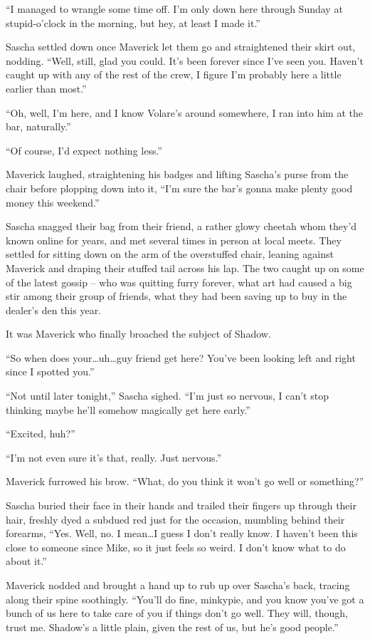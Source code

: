 ``I managed to wrangle some time off. I'm only down here through Sunday at stupid-o'clock in the morning, but hey, at least I made it.''

Sascha settled down once Maverick let them go and straightened their skirt out, nodding. ``Well, still, glad you could. It's been forever since I've seen you. Haven't caught up with any of the rest of the crew, I figure I'm probably here a little earlier than most.''

``Oh, well, I'm here, and I know Volare's around somewhere, I ran into him at the bar, naturally.''

``Of course, I'd expect nothing less.''

Maverick laughed, straightening his badges and lifting Sascha's purse from the chair before plopping down into it, ``I'm sure the bar's gonna make plenty good money this weekend.''

Sascha snagged their bag from their friend, a rather glowy cheetah whom they'd known online for years, and met several times in person at local meets. They settled for sitting down on the arm of the overstuffed chair, leaning against Maverick and draping their stuffed tail across his lap. The two caught up on some of the latest gossip -- who was quitting furry forever, what art had caused a big stir among their group of friends, what they had been saving up to buy in the dealer's den this year.

It was Maverick who finally broached the subject of Shadow.

``So when does your\ldots{}uh\ldots{}guy friend get here? You've been looking left and right since I spotted you.''

``Not until later tonight,'' Sascha sighed. ``I'm just so nervous, I can't stop thinking maybe he'll somehow magically get here early.''

``Excited, huh?''

``I'm not even sure it's that, really. Just nervous.''

Maverick furrowed his brow. ``What, do you think it won't go well or something?''

Sascha buried their face in their hands and trailed their fingers up through their hair, freshly dyed a subdued red just for the occasion, mumbling behind their forearms, ``Yes. Well, no. I mean\ldots{}I guess I don't really know. I haven't been this close to someone since Mike, so it just feels so weird. I don't know what to do about it.''

Maverick nodded and brought a hand up to rub up over Sascha's back, tracing along their spine soothingly. ``You'll do fine, minkypie, and you know you've got a bunch of us here to take care of you if things don't go well. They will, though, trust me. Shadow's a little plain, given the rest of us, but he's good people.''

